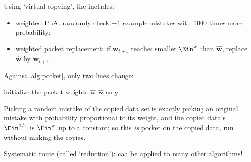 Using `virtual copying', the  includes:

\begin{itemize}
    \item weighted PLA: randomly check \(-1\) example mistakes with \(1000\)
        times more probability;
    \item weighted pocket replacement: if \(\bm{w}_{t+1}\) reaches smaller
        \(\Ein^{\mathrm{w}}\) than \(\hat{\bm{w}}\), replace \(\hat{\bm{w}}\) by
        \(\bm{w}_{t+1}\).
\end{itemize}

Against \autoref{alg:pocket}, only two lines change:

\begin{algorithm}[H]
    \caption{Weighted Pocket Algorithm}\label{alg:weighted-pocket}
    initialize the pocket weights \(\hat{\bm{w}}\)\;
    \Return \(\hat{\bm{w}}\) as \(g\)\;
\end{algorithm}

Picking a random mistake of the copied data set is exactly picking an original
mistake with probability proportional to its weight, and the copied data's
\(\Ein^{0/1}\) is \(\Ein^{\mathrm{w}}\) up to a constant; so this \emph{is}
pocket on the copied data, run without making the copies.

\begin{moral}
    Systematic route (called `reduction'): can be applied to many other
    algorithms!
\end{moral}

